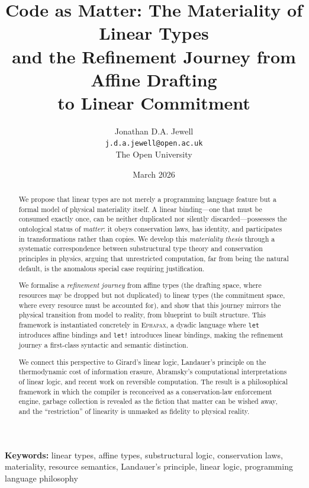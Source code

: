 \documentclass[11pt,a4paper]{article}
\title{%
  \textbf{Code as Matter: The Materiality of Linear Types \\
  and the Refinement Journey from Affine Drafting \\
  to Linear Commitment}%
}
\author{%
  Jonathan D.A. Jewell \\
  \texttt{j.d.a.jewell@open.ac.uk} \\
  \medskip
  \small The Open University
}
\date{March 2026}
\newcommand{\ephapax}{\textsc{Ephapax}}
\newcommand{\letbang}{\texttt{let!}}
\newcommand{\letkw}{\texttt{let}}
\begin{document}
\maketitle

\begin{abstract}
We propose that linear types are not merely a programming language feature
but a formal model of physical materiality itself. A linear binding---one that
must be consumed exactly once, can be neither duplicated nor silently
discarded---possesses the ontological status of \emph{matter}: it obeys
conservation laws, has identity, and participates in transformations rather
than copies. We develop this \emph{materiality thesis} through a systematic
correspondence between substructural type theory and conservation principles
in physics, arguing that unrestricted computation, far from being the
natural default, is the anomalous special case requiring justification.

We formalise a \emph{refinement journey} from affine types (the drafting
space, where resources may be dropped but not duplicated) to linear types
(the commitment space, where every resource must be accounted for), and show
that this journey mirrors the physical transition from model to reality, from
blueprint to built structure. This framework is instantiated concretely in
\ephapax{}, a dyadic language where \letkw{} introduces affine bindings and
\letbang{} introduces linear bindings, making the refinement journey a
first-class syntactic and semantic distinction.

We connect this perspective to Girard's linear logic, Landauer's principle
on the thermodynamic cost of information erasure, Abramsky's computational
interpretations of linear logic, and recent work on reversible computation.
The result is a philosophical framework in which the compiler is reconceived
as a conservation-law enforcement engine, garbage collection is revealed as
the fiction that matter can be wished away, and the ``restriction'' of
linearity is unmasked as fidelity to physical reality.
\end{abstract}

\bigskip

\noindent\textbf{Keywords:} linear types, affine types, substructural logic,
conservation laws, materiality, resource semantics, Landauer's principle,
linear logic, programming language philosophy
\end{document}
